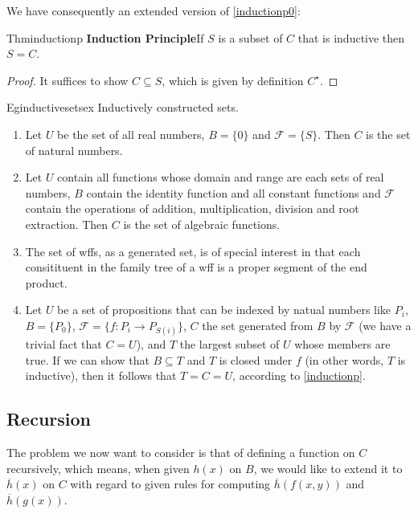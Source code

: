 We have consequently an extended version of \ref{inductionp0}:

\begin{reference}{Thm}{inductionp}
  \textbf{Induction Principle}\quad If $S$ is a subset of $C$ that is inductive then $S=C$.
\end{reference}

\begin{proof}
  It suffices to show $C\subseteq S$, which is given by definition $C^\star$.
\end{proof}

\begin{reference}{Eg}{inductivesetsex}
  Inductively constructed sets.
  \begin{enumerate}
    \item Let $U$ be the set of all real numbers, $B=\{0\}$ and $\mathcal{F}=\{S\}$. Then $C$ is the set of natural numbers.
    \item Let $U$ contain all functions whose domain and range are each sets of real numbers, $B$ contain the identity function and all constant functions and $\mathcal{F}$ contain the operations of addition, multiplication, division and root extraction. Then $C$ is the set of algebraic functions.
    \item The set of wffs, as a generated set, is of special interest in that each consitituent in the family tree of a wff is a proper segment of the end product.
    \item Let $U$ be a set of propositions that can be indexed by natual numbers like $P_i$, $B=\{P_0\}$, $\mathcal{F}=\{f:P_i\rightarrow P_{S(i)}\}$, $C$ the set generated from $B$ by $\mathcal{F}$ (we have a trivial fact that $C=U$), and $T$ the largest subset of $U$ whose members are true. If we can show that $B\subseteq T$ and $T$ is closed under $f$ (in other words, $T$ is inductive), then it follows that $T=C=U$, according to \ref{inductionp}.\qedhere
  \end{enumerate}
\end{reference}

\subsection*{Recursion}\label{sec:recur}

The problem we now want to consider is that of defining a function on $C$ recursively, which means, when given $h(x)$ on $B$, we would like to extend it to $\overline{h}(x)$ on $C$ with regard to given rules for computing $\overline{h}(f(x,y))$ and $\overline{h}(g(x))$.

